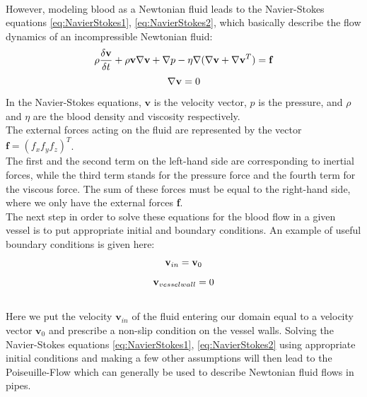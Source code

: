 \\However, modeling blood as a Newtonian fluid leads to the Navier-Stokes equations \ref{eq:NavierStokes1}, \ref{eq:NavierStokes2}, which basically describe the flow dynamics of an incompressible Newtonian fluid:
\begin{equation}
\\ \rho \frac{\delta \textbf{v}}{\delta t} + \rho \textbf{v} \nabla \textbf{v} + \nabla p - \eta \nabla ( \nabla \textbf{v} + \nabla \textbf{v}^T ) = \textbf{f}
\label{eq:NavierStokes1}
\end{equation}
\begin{equation}
\\ \nabla \textbf{v} = 0
\label{eq:NavierStokes2}
\end{equation}
In the Navier-Stokes equations, $\textbf{v}$ is the velocity vector, $p$ is the pressure, and $\rho$ and $\eta$ are the blood density and viscosity respectively.
\\The external forces acting on the fluid are represented by the vector $\textbf{f} = (f_x f_y f_z)^T$.
\\The first and the second term on the left-hand side are corresponding to inertial forces, while the third term stands for the pressure force and the fourth term for the viscous force. The sum of these forces must be equal to the right-hand side, where we only have the external forces \textbf{f}.
\\The next step in order to solve these equations for the blood flow in a given vessel is to put appropriate initial and boundary conditions. An example of useful boundary conditions is given here:
\\\begin{equation}
\\ \textbf{v}_{in} =  \textbf{v}_0
\label{eq:Boundary1}
\end{equation}
\begin{equation}
\\ \textbf{v}_{vessel wall} =  0
\label{eq:Boundary2}
\end{equation}
\\Here we put the velocity $\textbf{v}_{in}$ of the fluid entering our domain equal to a velocity vector $\textbf{v}_0$ and prescribe a non-slip condition on the vessel walls. Solving the Navier-Stokes equations \ref{eq:NavierStokes1}, \ref{eq:NavierStokes2} using appropriate initial conditions and making a few other assumptions will then lead to the Poiseuille-Flow which can generally be used to describe Newtonian fluid flows in pipes.

